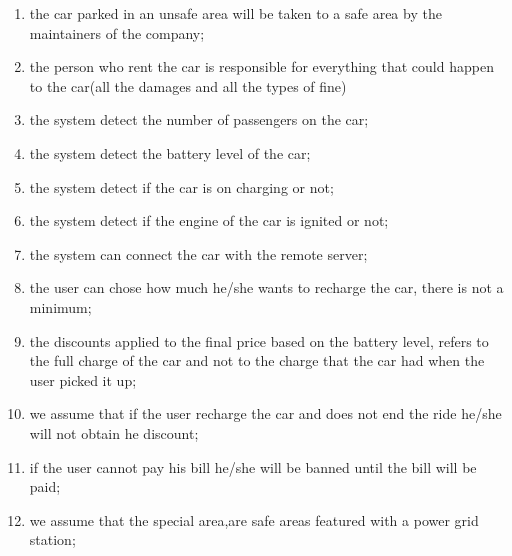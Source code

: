 \begin{enumerate}
	\item the car parked in an unsafe area will be taken to a safe area by the maintainers of the company;
	\item the person who rent the car is responsible for everything that could happen to the car(all the damages and all the types of fine)
	\item the system detect the number of passengers on the car;
	\item the system detect the battery level of the car;
	\item the system detect if the car is on charging or not;
	\item the system detect if the engine of the car is ignited or not;
	\item the system can connect the car with the remote server;
	\item the user can chose how much he/she wants to recharge the car, there is not a minimum;
	\item the discounts applied to the final price based on the battery level, refers to the full charge of the car and not to the charge that the car had when the user picked it up;
	\item we assume that if the user recharge the car and does not end the ride he/she will not obtain he discount;
	\item if the user cannot pay his bill he/she will be banned until the bill will be paid;
	\item we assume that the special area,are safe areas featured with a power grid station;
\end{enumerate}